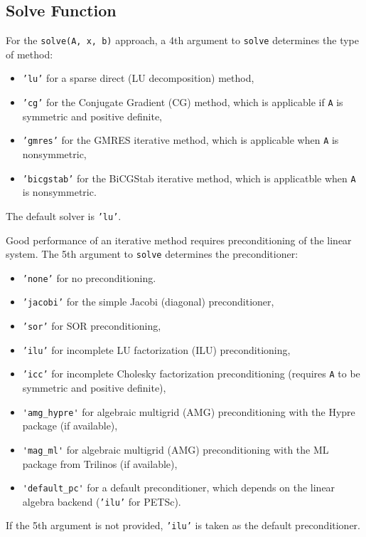 \subsection{Solve Function}

For the {\fontsize{12pt}{12pt}\texttt{solve(A, x, b)}} approach, a 4th argument to {\fontsize{12pt}{12pt}\texttt{solve}}
determines the type of method:
\begin{itemize}
\item {\fontsize{12pt}{12pt}\texttt{'lu'}} for a sparse direct (LU decomposition) method,
\item {\fontsize{12pt}{12pt}\texttt{'cg'}} for the Conjugate Gradient (CG) method, which is
applicable if {\fontsize{12pt}{12pt}\texttt{A}} is symmetric and positive definite,
\item {\fontsize{12pt}{12pt}\texttt{'gmres'}} for
the GMRES iterative method, which is applicable when {\fontsize{12pt}{12pt}\texttt{A}} is nonsymmetric,
\item {\fontsize{12pt}{12pt}\texttt{'bicgstab'}} for
the BiCGStab iterative method, which is applicatble when {\fontsize{12pt}{12pt}\texttt{A}} is
nonsymmetric.
\end{itemize}
The default solver is {\fontsize{12pt}{12pt}\texttt{'lu'}}.

Good performance of an iterative method requires preconditioning of
the linear system. The 5th argument to {\fontsize{12pt}{12pt}\texttt{solve}} determines the
preconditioner:
\begin{itemize}
\item {\fontsize{12pt}{12pt}\texttt{'none'}} for no preconditioning.
\item {\fontsize{12pt}{12pt}\texttt{'jacobi'}} for the simple Jacobi (diagonal) preconditioner,
\item {\fontsize{12pt}{12pt}\texttt{'sor'}} for SOR preconditioning,
\item {\fontsize{12pt}{12pt}\texttt{'ilu'}} for incomplete LU factorization (ILU) preconditioning,
\item {\fontsize{12pt}{12pt}\texttt{'icc'}} for incomplete Cholesky factorization preconditioning
(requires {\fontsize{12pt}{12pt}\texttt{A}} to be symmetric and positive definite),
\item {\fontsize{12pt}{12pt}\verb!'amg_hypre'!} for algebraic multigrid (AMG) preconditioning
with the Hypre package (if available),
\item {\fontsize{12pt}{12pt}\verb!'mag_ml'!} for algebraic multigrid (AMG) preconditioning
with the ML package from Trilinos (if available),
\item {\fontsize{12pt}{12pt}\verb!'default_pc'!} for a default preconditioner, which depends
on the linear algebra backend ({\fontsize{12pt}{12pt}\texttt{'ilu'}} for PETSc).
\end{itemize}
If the 5th argument is not provided, {\fontsize{12pt}{12pt}\texttt{'ilu'}} is taken as the default
preconditioner.

